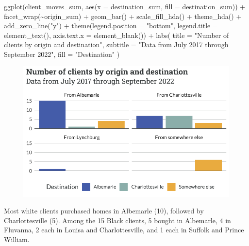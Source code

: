 \documentclass[
  letterpaper,
  DIV=11,
  numbers=noendperiod]{scrartcl}
\newenvironment{Shaded}{\begin{snugshade}}{\end{snugshade}}
\newcommand{\AttributeTok}[1]{\textcolor[rgb]{0.40,0.45,0.13}{#1}}
\newcommand{\FunctionTok}[1]{\textcolor[rgb]{0.28,0.35,0.67}{#1}}
\newcommand{\NormalTok}[1]{\textcolor[rgb]{0.00,0.23,0.31}{#1}}
\newcommand{\SpecialCharTok}[1]{\textcolor[rgb]{0.37,0.37,0.37}{#1}}
\newcommand{\StringTok}[1]{\textcolor[rgb]{0.13,0.47,0.30}{#1}}
\begin{document}
\begin{Shaded}
\begin{Highlighting}[]
\FunctionTok{ggplot}\NormalTok{(client\_moves\_sum, }\FunctionTok{aes}\NormalTok{(}\AttributeTok{x =}\NormalTok{ destination\_sum, }\AttributeTok{fill =}\NormalTok{ destination\_sum)) }\SpecialCharTok{+}
  \FunctionTok{facet\_wrap}\NormalTok{(}\SpecialCharTok{\textasciitilde{}}\NormalTok{origin\_sum) }\SpecialCharTok{+}
  \FunctionTok{geom\_bar}\NormalTok{() }\SpecialCharTok{+}
  \FunctionTok{scale\_fill\_hda}\NormalTok{() }\SpecialCharTok{+}
  \FunctionTok{theme\_hda}\NormalTok{() }\SpecialCharTok{+}
  \FunctionTok{add\_zero\_line}\NormalTok{(}\StringTok{"y"}\NormalTok{) }\SpecialCharTok{+}
  \FunctionTok{theme}\NormalTok{(}\AttributeTok{legend.position =} \StringTok{"bottom"}\NormalTok{,}
        \AttributeTok{legend.title =} \FunctionTok{element\_text}\NormalTok{(),}
        \AttributeTok{axis.text.x =} \FunctionTok{element\_blank}\NormalTok{()) }\SpecialCharTok{+}
  \FunctionTok{labs}\NormalTok{(}
    \AttributeTok{title =} \StringTok{"Number of clients by origin and destination"}\NormalTok{,}
    \AttributeTok{subtitle =} \StringTok{"Data from July 2017 through September 2022"}\NormalTok{,}
    \AttributeTok{fill =} \StringTok{"Destination"}
\NormalTok{  )}
\end{Highlighting}
\end{Shaded}

\begin{figure}[H]

{\centering \includegraphics{piedmont_files/figure-pdf/client-moves-sum-1.pdf}

}

\end{figure}

Most white clients purchased homes in Albemarle (10), followed by
Charlottesville (5). Among the 15 Black clients, 5 bought in Albemarle,
4 in Fluvanna, 2 each in Louisa and Charlottesville, and 1 each in
Suffolk and Prince William.
\end{document}
